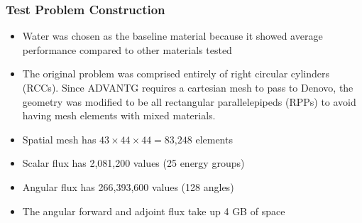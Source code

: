\documentclass[t]{beamer}
\begin{document}
\begin{frame}
  \frametitle{Test Problem Construction}
  \begin{itemize}
    \item Water was chosen as the baseline material because it showed average
          performance compared to other materials tested
    \item The original problem was comprised entirely of right circular
          cylinders (RCCs). Since ADVANTG requires a cartesian mesh to pass to
          Denovo, the geometry was modified to be all rectangular
          parallelepipeds (RPPs) to avoid having mesh elements with mixed
          materials.
    \item Spatial mesh has $43 \times 44 \times 44 = \text{83,248}$ elements
    \item Scalar flux has 2,081,200 values (25 energy groups)
    \item Angular flux has 266,393,600 values (128 angles)
    \item The angular forward and adjoint flux take up 4 GB of space
  \end{itemize}
\end{frame}
\end{document}

